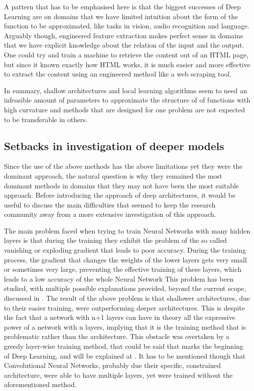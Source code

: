 \documentclass[a4paper]{report}
\begin{document}
		A pattern that has to be emphasised here is that the biggest successes of Deep Learning are on domains that we have limited intuition about the form of the function to be approximated, like tasks in vision, audio recognition and language. Arguably though, engineered feature extraction makes perfect sense in domains that we have explicit knowledge about the relation of the input and the output. One could try and train a machine to retrieve the content out of an HTML page, but since it known exactly how HTML works, it is much easier and more effective to extract the content using an engineered method like a web scraping tool.
	
	In summary, shallow architectures and local learning algorithms seem to need an infeasible amount of parameters to approximate the structure of of functions with high curvature and methods that are designed for one problem are not expected to be transferable in others.
	\subsection{Setbacks in investigation of deeper models}
		Since the use of the above methods has the above limitations yet they were the dominant approach, the natural question is why they remained the most dominant methods in domains that they may not have been the most suitable approach. Before introducing the approach of deep architectures, it would be useful to discuss the main difficulties that seemed to keep the research community away from a more extensive investigation of this approach.
		
		The main problem faced when trying to train Neural Networks with many hidden layers is that during the training they exhibit the problem of the so called vanishing or exploding gradient that leads to poor accuracy. During the training process, the gradient that changes the weights of the lower layers gets very small or sometimes very large, preventing the effective training of these layers, which leads to a low accuracy of the whole Neural Network \cite{Bengio2009} This problem has been studied, with multiple possible explanations provided, beyond the current scope, discussed in \cite{Bengio2007}. The result of the above problem is that shallower architectures, due to their easier training, were outperforming deeper architectures. This is despite the fact that a network with n+1 layers can have in theory all the expressive power of a network with n layers, implying that it is the training method that is problematic rather than the architecture. This obstacle was overtaken by a greedy layer-wise training method, that could be said that marks the beginning of Deep Learning, and will be explained at . It has to be mentioned though that Convolutional Neural Networks, probably due their specific, constrained architecture, were able to have multiple layers, yet were trained without the aforementioned method. 
		
\end{document}

